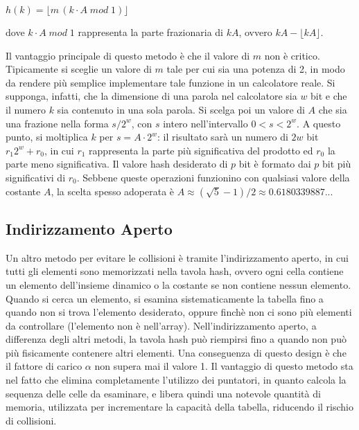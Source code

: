 \(h(k) = \lfloor m\,(k\cdot A\;mod\;1)\rfloor\)

\noindent dove \(k\cdot A \; mod \;1 \) rappresenta la parte frazionaria di \(kA\), ovvero \(kA-\lfloor kA\rfloor\). 

Il vantaggio principale di questo metodo è che il valore di \(m\) non è critico. Tipicamente si sceglie un valore di \(m\) tale per cui sia una potenza di 2, in modo da rendere più semplice implementare tale funzione in un calcolatore reale. Si supponga, infatti, che la dimensione di una parola nel calcolatore sia \(w\) bit e che il numero \(k\) sia contenuto in una sola parola. Si scelga poi un valore di \(A\) che sia una frazione nella forma \(s/2^w\), con \(s\) intero nell'intervallo \(0<s<2^w\). A questo punto, si moltiplica \(k\) per \(s=A\cdot 2^w\): il risultato sarà un numero di \(2w\) bit \(r_1 2^w+r_0\), in cui \(r_1\) rappresenta la parte più significativa del prodotto ed \(r_0\) la parte meno significativa. Il valore hash desiderato di \(p\) bit è formato dai \(p\) bit più significativi di \(r_0\). Sebbene queste operazioni funzionino con qualsiasi valore della costante \(A\), la scelta spesso adoperata è \(A \approx (\sqrt{5}-1)/2 \approx 0.6180339887...\)

\subsection{Indirizzamento Aperto}
Un altro metodo per evitare le collisioni è tramite l'indirizzamento aperto, in cui tutti gli elementi sono memorizzati nella tavola hash, ovvero ogni cella contiene un elemento dell'insieme dinamico o la costante  se non contiene nessun elemento. Quando si cerca un elemento, si esamina sistematicamente la tabella fino a quando non si trova l'elemento desiderato, oppure finchè non ci sono più elementi da controllare (l'elemento non è nell'array). Nell'indirizzamento aperto, a differenza degli altri metodi, la tavola hash può riempirsi fino a quando non può più fisicamente contenere altri elementi. Una conseguenza di questo design è che il fattore di carico \(\alpha\) non supera mai il valore 1. Il vantaggio di questo metodo sta nel fatto che elimina completamente l'utilizzo dei puntatori, in quanto calcola la sequenza delle celle da esaminare, e libera quindi una notevole quantità di memoria, utilizzata per incrementare la capacità della tabella, riducendo il rischio di collisioni. 

